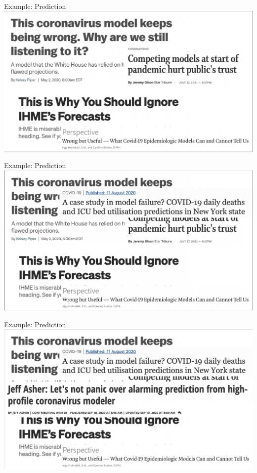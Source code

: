 \documentclass[10pt,t]{beamer}
\begin{document}
\begin{frame}[c]{Example: Prediction}
\centering \includegraphics[scale=0.37]{ihme4.png}
\end{frame}

\begin{frame}[c]{Example: Prediction}
\centering \includegraphics[scale=0.37]{ihme5.png}
\end{frame}

\begin{frame}[c]{Example: Prediction}
\centering \includegraphics[scale=0.37]{ihme6.png}
\end{frame}
\end{document}
